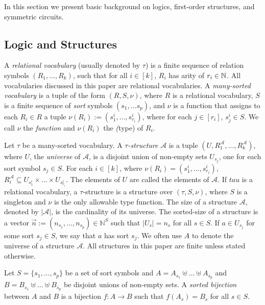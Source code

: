\documentclass[../paper.tex]{subfiles}
\begin{document}
In this section we present basic background on logics, first-order structures,
and symmetric circuits.

\subsection{Logic and Structures}
A \emph{relational vocabulary} (usually denoted by $\tau$) is a finite sequence
of relation symbols $(R_1, \ldots, R_k)$, such that for all $i \in [k]$, $R_i$
has arity of $r_i \in \mathbb{N}$. All vocabularies discussed in this paper are
relational vocabularies. A \emph{many-sorted vocabulary} is a tuple of the form
$(R, S, \nu)$, where $R$ is a relational vocabulary, $S$ is a finite sequence of
\emph{sort} symbols $(s_1, \ldots s_p)$, and $\nu$ is a function that assigns to
each $R_i \in R$ a tuple $\nu(R_i) := (s^i_1, \ldots, s^i_{r_i})$, where for
each $j \in [r_i]$, $s^i_j \in S$. We call $\nu$ the \emph{\type function} and
$\nu(R_i)$ the \emph(type) of $R_i$.

Let $\tau$ be a many-sorted vocabulary. A \emph{$\tau$-structure} $\mathcal{A}$
is a tuple $(U , R^{\mathcal{A}}_1 , \ldots , R^{\mathcal{A}}_k )$, where $U$,
the \emph{universe} of $\mathcal{A}$, is a disjoint union of non-empty sets
$U_{s_j}$, one for each sort symbol $s_j \in S$. For each $i \in [k]$, where
$\nu(R_i) = (s^i_1 , \ldots , s^i_{r_i})$, $R^{\mathcal{A}}_i \subseteq
U_{s^i_1} \times \ldots \times U_{s^i_{r_i}}$. The elements of $U$ are called
the elements of $\mathcal{A}$. If $tau$ is a relational vocabulary, a
$\tau$-structure is a structure over $(\tau, S, \nu)$, where $S$ is a singleton
and $\nu$ is the only allowable type function. The size of a structure
$\mathcal{A}$, denoted by $\vert \mathcal{A} \vert$, is the cardinality of its
universe. The sorted-size of a structure is a vector $\vec{n} := (n_{s_1},
\ldots , n_{s_p}) \in \mathbb{N}^{S}$ such that $\vert U_{s} \vert = n_{s}$ for
all $s \in S$. If $a \in U_{s_j}$ for some sort $s_j \in S$, we say that $a$ has
sort $s_j$. We often use $A$ to denote the universe of a structure
$\mathcal{A}$. All structures in this paper are finite unless stated otherwise.

\begin{definition}
  Let $S = \{s_1, \ldots , s_p\}$ be a set of sort symbols and $A = A_{s_1}
  \uplus \ldots \uplus A_{s_p}$ and $B = B_{s_1}\uplus \ldots \uplus
  B_{s_p}$ be disjoint unions of non-empty sets. A \emph{sorted bijection}
  between $A$ and $B$ is a bijection $f: A \rightarrow B$ such that $f (A_s) =
  B_s$ for all $s \in S$.
\end{definition}
\end{document}
